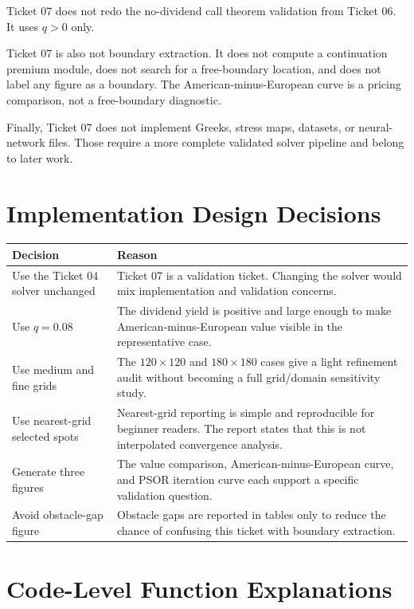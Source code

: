 \documentclass[11pt,a4paper]{article}
\begin{document}
Ticket 07 does not redo the no-dividend call theorem validation from Ticket 06. It uses \(q>0\)
only.

Ticket 07 is also not boundary extraction. It does not compute a continuation premium module,
does not search for a free-boundary location, and does not label any figure as a boundary. The
American-minus-European curve is a pricing comparison, not a free-boundary diagnostic.

Finally, Ticket 07 does not implement Greeks, stress maps, datasets, or neural-network files.
Those require a more complete validated solver pipeline and belong to later work.

\section{Implementation Design Decisions}

\begin{longtable}{L{0.28\textwidth}L{0.60\textwidth}}
\toprule
Decision & Reason \\
\midrule
\endhead
Use the Ticket 04 solver unchanged &
Ticket 07 is a validation ticket. Changing the solver would mix implementation and validation
concerns. \\
Use \(q=0.08\) &
The dividend yield is positive and large enough to make American-minus-European value visible in
the representative case. \\
Use medium and fine grids &
The \(120\times120\) and \(180\times180\) cases give a light refinement audit without becoming a
full grid/domain sensitivity study. \\
Use nearest-grid selected spots &
Nearest-grid reporting is simple and reproducible for beginner readers. The report states that
this is not interpolated convergence analysis. \\
Generate three figures &
The value comparison, American-minus-European curve, and PSOR iteration curve each support a
specific validation question. \\
Avoid obstacle-gap figure &
Obstacle gaps are reported in tables only to reduce the chance of confusing this ticket with
boundary extraction. \\
\bottomrule
\end{longtable}

\section{Code-Level Function Explanations}
\end{document}
